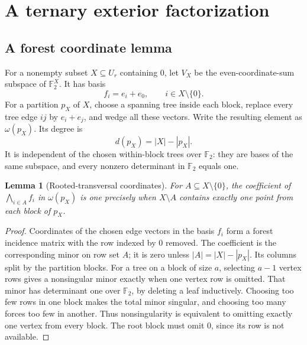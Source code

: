 \documentclass[11pt,letterpaper]{article}
\newtheorem{lemma}[theorem]{Lemma}
\theoremstyle{definition}
\newcommand{\F}{\mathbb F}
\begin{document}
\section{A ternary exterior factorization}
\subsection{A forest coordinate lemma}
For a nonempty subset $X\subseteq U_r$ containing $0$, let $V_X$ be the even-coordinate-sum subspace of $\F_2^X$. It has basis
\[
 f_i=e_i+e_0,\qquad i\in X\setminus\{0\}.
\]
For a partition $p_X$ of $X$, choose a spanning tree inside each block, replace every tree edge $ij$ by $e_i+e_j$, and wedge all these vectors. Write the resulting element as $\omega(p_X)$. Its degree is
\[
 d(p_X)=|X|-|p_X|.
\]
It is independent of the chosen within-block trees over $\F_2$: they are bases of the same subspace, and every nonzero determinant in $\F_2$ equals one.

\begin{lemma}[Rooted-transversal coordinates]\label{lem:transversal}
For $A\subseteq X\setminus\{0\}$, the coefficient of $\bigwedge_{i\in A}f_i$ in $\omega(p_X)$ is one precisely when $X\setminus A$ contains exactly one point from each block of $p_X$.
\end{lemma}
\begin{proof}
Coordinates of the chosen edge vectors in the basis $f_i$ form a forest incidence matrix with the row indexed by $0$ removed. The coefficient is the corresponding minor on row set $A$; it is zero unless $|A|=|X|-|p_X|$. Its columns split by the partition blocks. For a tree on a block of size $a$, selecting $a-1$ vertex rows gives a nonsingular minor exactly when one vertex row is omitted. That minor has determinant one over $\F_2$, by deleting a leaf inductively. Choosing too few rows in one block makes the total minor singular, and choosing too many forces too few in another. Thus nonsingularity is equivalent to omitting exactly one vertex from every block. The root block must omit $0$, since its row is not available.
\end{proof}
\end{document}
